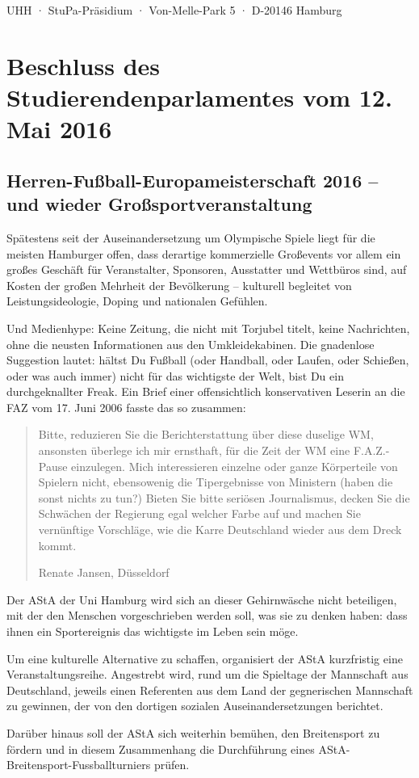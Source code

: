 \documentclass[ngerman,headheight=70pt]{scrartcl}
\begin{document}
    UHH · StuPa-Präsidium · Von-Melle-Park 5 · D-20146 Hamburg

    \section*{Beschluss des Studierendenparlamentes vom 12. Mai 2016}
    \subsection*{Herren-Fußball-Europameisterschaft 2016 – und wieder
    Großsportveranstaltung}

    Spätestens seit der Auseinandersetzung um Olympische Spiele liegt für die
    meisten Hamburger offen, dass derartige kommerzielle Großevents vor allem
    ein großes Geschäft für Veranstalter, Sponsoren, Ausstatter und Wettbüros
    sind, auf Kosten der großen Mehrheit der Bevölkerung – kulturell begleitet
    von Leistungsideologie, Doping und nationalen Gefühlen.

    Und Medienhype: Keine Zeitung, die nicht mit Torjubel titelt, keine
    Nachrichten, ohne die neusten Informationen aus den Umkleidekabinen. Die
    gnadenlose Suggestion lautet: hältst Du Fußball (oder Handball, oder Laufen,
    oder Schießen, oder was auch immer) nicht für das wichtigste der Welt, bist
    Du ein durchgeknallter Freak. Ein Brief einer offensichtlich konservativen
    Leserin an die FAZ vom 17. Juni 2006 fasste das so zusammen:

    \blockquote[Renate Jansen, Düsseldorf]{Bitte, reduzieren Sie die Berichterstattung über diese duselige WM, ansonsten
    überlege ich mir ernsthaft, für die Zeit der WM eine F.A.Z.-Pause einzulegen.
    Mich interessieren einzelne oder ganze Körperteile von Spielern nicht,
    ebensowenig die Tipergebnisse von Ministern (haben die sonst nichts zu tun?)
    Bieten Sie bitte seriösen Journalismus, decken Sie die Schwächen der Regierung
    egal welcher Farbe auf und machen Sie vernünftige Vorschläge, wie die Karre
    Deutschland wieder aus dem Dreck kommt.}

    Der AStA der Uni Hamburg wird sich an dieser Gehirnwäsche nicht beteiligen,
    mit der den Menschen vorgeschrieben werden soll, was sie zu denken haben:
    dass ihnen ein Sportereignis das wichtigste im Leben sein möge.

    Um eine kulturelle Alternative zu schaffen, organisiert der AStA kurzfristig
    eine Veranstaltungsreihe. Angestrebt wird, rund um die Spieltage der
    Mannschaft aus Deutschland, jeweils einen Referenten aus dem Land der
    gegnerischen Mannschaft zu gewinnen, der von den dortigen sozialen
    Auseinandersetzungen berichtet.

    Darüber hinaus soll der AStA sich weiterhin bemühen, den Breitensport zu
    fördern und in diesem Zusammenhang die Durchführung eines
    AStA-Breitensport-Fussballturniers prüfen.
\end{document}
